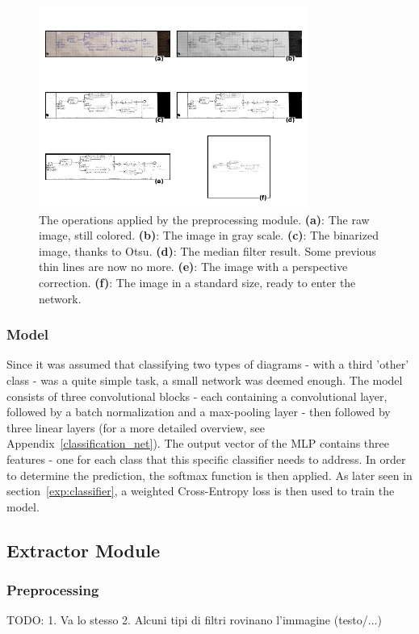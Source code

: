 \documentclass[conference]{IEEEtran}
\begin{document}
\begin{figure}[H]
	\centering
	\includegraphics[width=250pt]{classifier_preprocessing.png}
	\caption{
		The operations applied by the preprocessing module.
		\textbf{(a)}: The raw image, still colored.
		\textbf{(b)}: The image in gray scale.
		\textbf{(c)}: The binarized image, thanks to Otsu.
		\textbf{(d)}: The median filter result. Some previous thin lines are now no more.
		\textbf{(e)}: The image with a perspective correction.
		\textbf{(f)}: The image in a standard size, ready to enter the network.
	}
	\label{fig:classifier_preprocessing}
\end{figure} 

\subsubsection{Model}
Since it was assumed that classifying two types of diagrams - with a third 'other' class - was a quite simple task, a small network was deemed enough. The model consists of three convolutional blocks - each containing a convolutional layer, followed by a batch normalization and a max-pooling layer - then followed by three linear layers (for a more detailed overview, see Appendix~\ref{classification_net}). The output vector of the MLP contains three features - one for each class that this specific classifier needs to address. In order to determine the prediction, the softmax function is then applied. As later seen in section~\ref{exp:classifier}, a weighted Cross-Entropy loss is then used to train the model.  \\

\subsection{Extractor Module}
\subsubsection{Preprocessing}
TODO:
1. Va lo stesso
2. Alcuni tipi di filtri rovinano l'immagine (testo/...)
\end{document}
